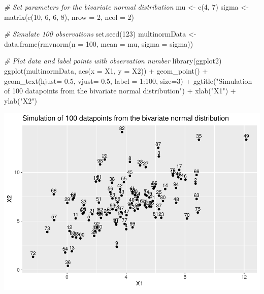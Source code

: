 \documentclass[
]{article}
\newenvironment{Shaded}{\begin{snugshade}}{\end{snugshade}}
\newcommand{\AttributeTok}[1]{\textcolor[rgb]{0.77,0.63,0.00}{#1}}
\newcommand{\CommentTok}[1]{\textcolor[rgb]{0.56,0.35,0.01}{\textit{#1}}}
\newcommand{\DecValTok}[1]{\textcolor[rgb]{0.00,0.00,0.81}{#1}}
\newcommand{\FloatTok}[1]{\textcolor[rgb]{0.00,0.00,0.81}{#1}}
\newcommand{\FunctionTok}[1]{\textcolor[rgb]{0.00,0.00,0.00}{#1}}
\newcommand{\NormalTok}[1]{#1}
\newcommand{\OtherTok}[1]{\textcolor[rgb]{0.56,0.35,0.01}{#1}}
\newcommand{\SpecialCharTok}[1]{\textcolor[rgb]{0.00,0.00,0.00}{#1}}
\newcommand{\StringTok}[1]{\textcolor[rgb]{0.31,0.60,0.02}{#1}}
\begin{document}
\begin{Shaded}
\begin{Highlighting}[]
\CommentTok{\# Set parameters for the bivariate normal distribution}
\NormalTok{mu }\OtherTok{\textless{}{-}} \FunctionTok{c}\NormalTok{(}\DecValTok{4}\NormalTok{, }\DecValTok{7}\NormalTok{)}
\NormalTok{sigma }\OtherTok{\textless{}{-}} \FunctionTok{matrix}\NormalTok{(}\FunctionTok{c}\NormalTok{(}\DecValTok{10}\NormalTok{, }\DecValTok{6}\NormalTok{, }\DecValTok{6}\NormalTok{, }\DecValTok{8}\NormalTok{), }\AttributeTok{nrow =} \DecValTok{2}\NormalTok{, }\AttributeTok{ncol =} \DecValTok{2}\NormalTok{)}

\CommentTok{\# Simulate 100 observations}
\FunctionTok{set.seed}\NormalTok{(}\DecValTok{123}\NormalTok{)}
\NormalTok{multinormData }\OtherTok{\textless{}{-}} \FunctionTok{data.frame}\NormalTok{(}\FunctionTok{rmvnorm}\NormalTok{(}\AttributeTok{n =} \DecValTok{100}\NormalTok{, }\AttributeTok{mean =}\NormalTok{ mu, }\AttributeTok{sigma =}\NormalTok{ sigma))}

\CommentTok{\# Plot data and label points with observation number}
\FunctionTok{library}\NormalTok{(ggplot2)}
\FunctionTok{ggplot}\NormalTok{(multinormData, }\FunctionTok{aes}\NormalTok{(}\AttributeTok{x =}\NormalTok{ X1, }\AttributeTok{y =}\NormalTok{ X2)) }\SpecialCharTok{+} 
  \FunctionTok{geom\_point}\NormalTok{() }\SpecialCharTok{+} \FunctionTok{geom\_text}\NormalTok{(}\AttributeTok{hjust=} \FloatTok{0.5}\NormalTok{, }\AttributeTok{vjust=}\SpecialCharTok{{-}}\FloatTok{0.5}\NormalTok{, }\AttributeTok{label =} \DecValTok{1}\SpecialCharTok{:}\DecValTok{100}\NormalTok{, }\AttributeTok{size=}\DecValTok{3}\NormalTok{) }\SpecialCharTok{+}
  \FunctionTok{ggtitle}\NormalTok{(}\StringTok{"Simulation of 100 datapoints from the bivariate normal distribution"}\NormalTok{) }\SpecialCharTok{+} 
  \FunctionTok{xlab}\NormalTok{(}\StringTok{"X1"}\NormalTok{) }\SpecialCharTok{+} \FunctionTok{ylab}\NormalTok{(}\StringTok{"X2"}\NormalTok{) }
\end{Highlighting}
\end{Shaded}

\includegraphics{assignment2_files/figure-latex/unnamed-chunk-2-1.pdf}
\end{document}
